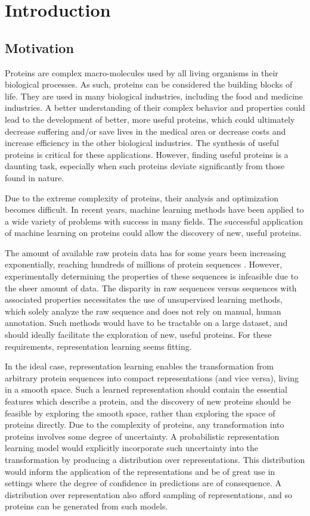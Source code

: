 \chapter{Introduction}
\label{chapter:introduction}
\section{Motivation}
Proteins are complex macro-molecules used by all living organisms in their biological processes. As such, proteins can be considered the building blocks of life. They are used in many biological industries, including the food and medicine industries. A better understanding of their complex behavior and properties could lead to the development of better, more useful proteins, which could ultimately decrease suffering and/or save lives in the medical area or decrease costs and increase efficiency in the other biological industries. The synthesis of useful proteins is critical for these applications. However, finding useful proteins is a daunting task, especially when such proteins deviate significantly from those found in nature.

Due to the extreme complexity of proteins, their analysis and optimization becomes difficult. In recent years, machine learning methods have been applied to a wide variety of problems with success in many fields. The successful application of machine learning on proteins could allow the discovery of new, useful proteins.

The amount of available raw protein data has for some years been increasing exponentially, reaching hundreds of millions of protein sequences \cite{uniprot2007universal}. However, experimentally determining the properties of these sequences is infeasible due to the sheer amount of data. The disparity in raw sequences versus sequences with associated properties necessitates the use of unsupervised learning methods, which solely analyze the raw sequence and does not rely on manual, human annotation. Such methods would have to be tractable on a large dataset, and should ideally facilitate the exploration of new, useful proteins. For these requirements, representation learning seems fitting.

In the ideal case, representation learning enables the transformation from arbitrary protein sequences into compact representations (and vice versa), living in a smooth space. Such a learned representation should contain the essential features which describe a protein, and the discovery of new proteins should be feasible by exploring the smooth space, rather than exploring the space of proteins directly. Due to the complexity of proteins, any transformation into proteins involves some degree of uncertainty. A probabilistic representation learning model would explicitly incorporate such uncertainty into the transformation by producing a distribution over representations. This distribution would inform the application of the representations and be of great use in settings where the degree of confidence in predictions are of consequence. A distribution over representation also afford sampling of representations, and so proteins can be generated from such models.

